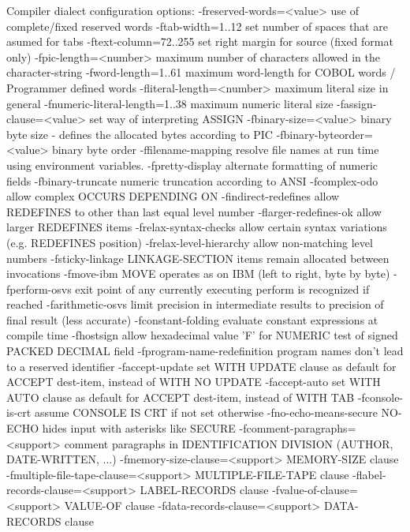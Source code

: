 Compiler dialect configuration options:
  -freserved-words=<value>	use of complete/fixed reserved words
  -ftab-width=1..12      set number of spaces that are asumed for tabs
  -ftext-column=72..255  set right margin for source (fixed format only)
  -fpic-length=<number>  maximum number of characters allowed in the character-string
  -fword-length=1..61    maximum word-length for COBOL words / Programmer defined words
  -fliteral-length=<number>	maximum literal size in general
  -fnumeric-literal-length=1..38	maximum numeric literal size
  -fassign-clause=<value>	set way of interpreting ASSIGN
  -fbinary-size=<value>  binary byte size - defines the allocated bytes according to PIC
  -fbinary-byteorder=<value>	binary byte order
  -ffilename-mapping     resolve file names at run time using environment variables.
  -fpretty-display       alternate formatting of numeric fields
  -fbinary-truncate      numeric truncation according to ANSI
  -fcomplex-odo          allow complex OCCURS DEPENDING ON
  -findirect-redefines   allow REDEFINES to other than last equal level number
  -flarger-redefines-ok  allow larger REDEFINES items
  -frelax-syntax-checks  allow certain syntax variations (e.g. REDEFINES position)
  -frelax-level-hierarchy	allow non-matching level numbers
  -fsticky-linkage       LINKAGE-SECTION items remain allocated between invocations
  -fmove-ibm             MOVE operates as on IBM (left to right, byte by byte)
  -fperform-osvs         exit point of any currently executing perform is recognized if reached
  -farithmetic-osvs      limit precision in intermediate results to precision of final result (less accurate)
  -fconstant-folding     evaluate constant expressions at compile time
  -fhostsign             allow hexadecimal value 'F' for NUMERIC test of signed PACKED DECIMAL field
  -fprogram-name-redefinition	program names don't lead to a reserved identifier
  -faccept-update        set WITH UPDATE clause as default for ACCEPT dest-item, instead of WITH NO UPDATE
  -faccept-auto          set WITH AUTO clause as default for ACCEPT dest-item, instead of WITH TAB
  -fconsole-is-crt       assume CONSOLE IS CRT if not set otherwise
  -fno-echo-means-secure	NO-ECHO hides input with asterisks like SECURE
  -fcomment-paragraphs=<support>	comment paragraphs in IDENTIFICATION DIVISION (AUTHOR, DATE-WRITTEN, ...)
  -fmemory-size-clause=<support>	MEMORY-SIZE clause
  -fmultiple-file-tape-clause=<support>	MULTIPLE-FILE-TAPE clause
  -flabel-records-clause=<support>	LABEL-RECORDS clause
  -fvalue-of-clause=<support>	VALUE-OF clause
  -fdata-records-clause=<support>	DATA-RECORDS clause
